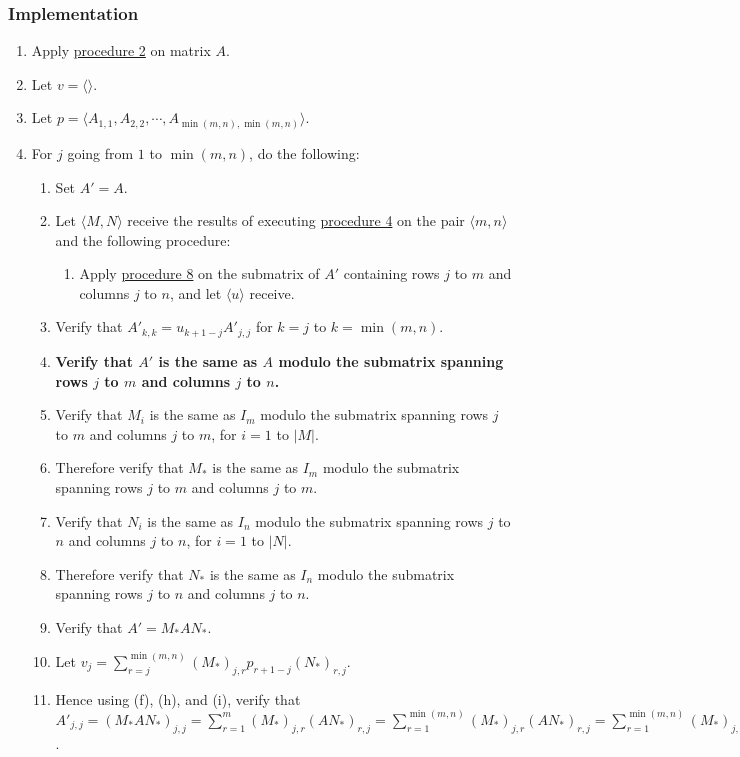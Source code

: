 \documentclass[twocolumn]{article}
\begin{document}
			\subsubsection{Implementation}
				\begin{enumerate}
					\item Apply \hyperref[sec:procedure 2]{procedure 2} on matrix $A$.
					\item Let $v=\langle\rangle$.
					\item Let $p=\langle A_{1,1},A_{2,2},\cdots,A_{\min(m,n),\min(m,n)}\rangle$.
					\item For $j$ going from $1$ to $\min(m,n)$, do the following:
					\begin{enumerate}
						\item Set $A'=A$.
						\item Let $\langle M,N\rangle$ receive the results of executing \hyperref[sec:procedure 4]{procedure 4} on the pair $\langle m,n\rangle$ and the following procedure:
						\begin{enumerate}
							\item Apply \hyperref[sec:procedure 8]{procedure 8} on the submatrix of $A'$ containing rows $j$ to $m$ and columns $j$ to $n$, and let $\langle u\rangle$ receive.
						\end{enumerate}
						\item Verify that $A'_{k,k}=u_{k+1-j}A'_{j,j}$ for $k=j$ to $k=\min(m,n)$.
						\item \textbf{Verify that $A'$ is the same as $A$ modulo the submatrix spanning rows $j$ to $m$ and columns $j$ to $n$.}
						\item Verify that $M_i$ is the same as $I_m$ modulo the submatrix spanning rows $j$ to $m$ and columns $j$ to $m$, for $i=1$ to $\lvert M\rvert$.
						\item Therefore verify that $M_*$ is the same as $I_m$ modulo the submatrix spanning rows $j$ to $m$ and columns $j$ to $m$.
						\item Verify that $N_i$ is the same as $I_n$ modulo the submatrix spanning rows $j$ to $n$ and columns $j$ to $n$, for $i=1$ to $\lvert N\rvert$.
						\item Therefore verify that $N_*$ is the same as $I_n$ modulo the submatrix spanning rows $j$ to $n$ and columns $j$ to $n$.
						\item Verify that $A'=M_*AN_*$.
						\item Let $v_j=\sum_{r=j}^{\min(m,n)} (M_*)_{j,r}p_{r+1-j}(N_*)_{r,j}$.
						\item Hence using (f), (h), and (i), verify that $A'_{j,j}=(M_*AN_*)_{j,j}=\sum_{r=1}^m (M_*)_{j,r}(AN_*)_{r,j}=\sum_{r=1}^{\min(m,n)} (M_*)_{j,r}(AN_*)_{r,j}=\sum_{r=1}^{\min(m,n)} (M_*)_{j,r}A_{r,r}(N_*)_{r,j}=\sum_{r=j}^{\min(m,n)} (M_*)_{j,r}A_{r,r}(N_*)_{r,j}=\sum_{r=j}^{\min(m,n)} (M_*)_{j,r}A_{j-1,j-1}p_{r+1-j}(N_*)_{r,j}=A_{j-1,j-1}\sum_{r=j}^{\min(m,n)} (M_*)_{j,r}p_{r+1-j}(N_*)_{r,j}=A'_{j-1,j-1}\sum_{r=j}^{\min(m,n)} (M_*)_{j,r}p_{r+1-j}(N_*)_{r,j}=A'_{j-1,j-1}v_j$.

\end{enumerate}
\end{enumerate}
\end{document}
